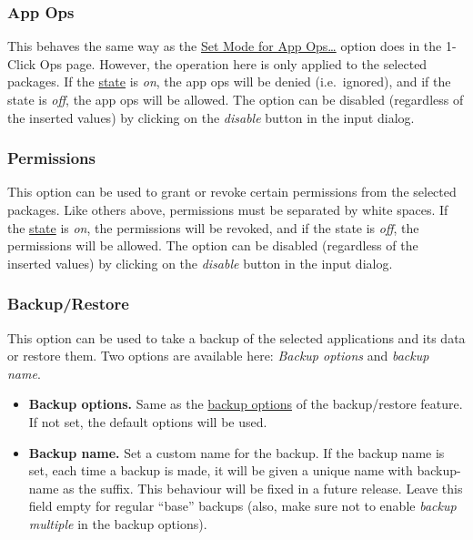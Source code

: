 
\subsubsection{App Ops} %
This behaves the same way as the \hyperref[subsec:set-mode-for-app-ops-dots]{Set Mode for App Ops\dots} option does in
the 1-Click Ops page. However, the operation here is only applied to the selected packages.
If the \hyperref[subsubsec:profile-state]{state} is \textit{on}, the app ops will be denied (i.e.\ ignored),
and if the state is \textit{off}, the app ops will be allowed. The option can be disabled (regardless of the inserted
values) by clicking on the \textit{disable} button in the input dialog.

\subsubsection{Permissions} %
This option can be used to grant or revoke certain permissions from the selected packages. Like others above,
permissions must be separated by white spaces. If the \hyperref[subsubsec:profile-state]{state} is \textit{on}, the
permissions will be revoked, and if the state is \textit{off}, the permissions will be allowed. The option can be
disabled (regardless of the inserted values) by clicking on the \textit{disable} button in the input dialog.

\subsubsection{Backup/Restore} %
This option can be used to take a backup of the selected applications and its data or restore them.
Two options are available here: \textit{Backup options} and \textit{backup name}.
\begin{itemize}
    \item \textbf{Backup options.} Same as the \hyperref[subsec:backup-restore-backup-options]{backup options} of the
    backup/restore feature. If not set, the default options will be used.
    \item \textbf{Backup name.} Set a custom name for the backup. If the backup name is set, each time a backup is made,
    it will be given a unique name with backup-name as the suffix. This behaviour will be fixed in a future release.
    Leave this field empty for regular ``base'' backups (also, make sure not to enable \textit{backup multiple} in the
    backup options).
\end{itemize}

